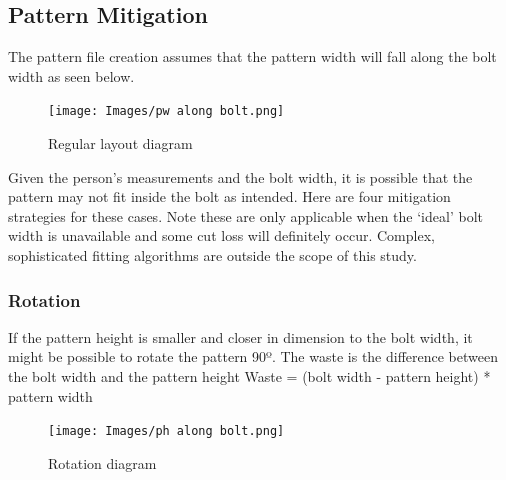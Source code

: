\subsection{Pattern Mitigation}
The pattern file creation assumes that the pattern width will fall along the bolt width as seen below.
\begin{figure} [H] %
    \centering %
    \texttt{[image: Images/pw along bolt.png]} %
    \caption{Regular layout diagram}
\end{figure}
Given the person’s measurements and the bolt width, it is possible that the pattern may not fit inside the bolt as intended. Here are four mitigation strategies for these cases. Note these are only applicable when the ‘ideal’ bolt width is unavailable and some cut loss will definitely occur. Complex, sophisticated fitting algorithms are outside the scope of this study.
\subsubsection{Rotation}
If the pattern height is smaller and closer in dimension to the bolt width, it might be possible to rotate the pattern 90º.
The waste is the difference between the bolt width and the pattern height \newline
Waste = (bolt width - pattern height) * pattern width
\begin{figure} [H] %
    \centering %
    \texttt{[image: Images/ph along bolt.png]} %
    \caption{Rotation diagram}
\end{figure}

